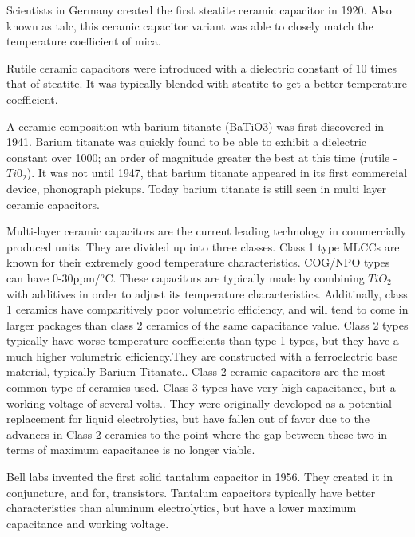 \noindent Scientists in Germany created the first steatite ceramic capacitor in 1920. \cite[Ch 3 Sec II]{cerMaterials} \cite{cerDie} Also known as talc, this ceramic capacitor variant was able to closely match the temperature coefficient of mica.\cite{steatite_hf}     

\noindent Rutile ceramic capacitors were introduced with a dielectric constant of 10 times that of steatite. It was typically blended with steatite to get a better temperature coefficient. 

\noindent A ceramic composition wth barium titanate (BaTiO3) was first discovered in 1941. Barium titanate was quickly found to be able to exhibit a dielectric constant over 1000; an order of magnitude greater the best at this time (rutile - $Ti0_2$). It was not until 1947, that barium titanate appeared in its first commercial device, phonograph pickups.\cite{piezCer}\cite{hist_cerFilt}\cite[Ch 3 Sec III]{cerMaterials} Today barium titanate is still seen in multi layer ceramic capacitors.

\noindent Multi-layer ceramic capacitors are the current leading technology in commercially produced units. They are divided up into three classes. Class 1 type MLCCs are known for their extremely good temperature characteristics. COG/NPO types can have 0-30ppm/$^o$C. These capacitors are typically made by combining $TiO_2$ with additives in order to adjust its temperature characteristics\cite{intro_cerCaps}. Additinally, class 1 ceramics have comparitively poor volumetric efficiency, and will tend to come in larger packages than class 2 ceramics of the same capacitance value. Class 2 types typically have worse temperature coefficients than type 1 types, but they have a much higher volumetric efficiency.They are constructed with a ferroelectric base material, typically Barium Titanate.\cite{intro_cerCaps}. Class 2 ceramic capacitors are the most common type of ceramics used. Class 3 types have very high capacitance, but a working voltage of several volts.\cite{hist_cerFilt}\cite[Ch 3 Sec VI]{cerMaterials}\cite{atCer_tempco}. They were originally developed as a potential replacement for liquid electrolytics, but have fallen out of favor due to the advances in Class 2 ceramics to the point where the gap between these two in terms of maximum capacitance is no longer viable\cite{wiki_cer}.

\noindent Bell labs invented the first solid tantalum capacitor in 1956. They created it in conjuncture, and for, transistors.\cite[f.~56-64]{dumInv} Tantalum capacitors typically have better characteristics than aluminum electrolytics, but have a lower maximum capacitance and working voltage.\cite{learn_caps}


